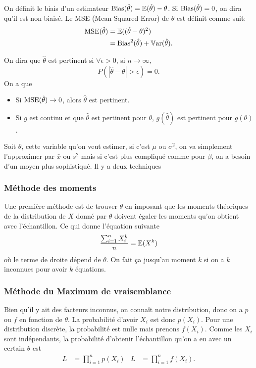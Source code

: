 On définit le biais d'un estimateur $\operatorname{Bias}(\hat{\theta}) = \mathbb{E}(\hat{\theta}) - \theta$.
Si $\operatorname{Bias}(\hat{\theta}) = 0$, on dira qu'il est non biaisé.
Le MSE (Mean Squared Error) de $\hat{\theta}$ est définit comme suit:
\begin{align*}
  \operatorname{MSE}(\hat{\theta}) & = \mathbb{E}((\hat{\theta} - \theta)^2)\\
                    & = \operatorname{Bias}^2(\hat{\theta}) + \operatorname{\mathbb{V}ar}(\hat{\theta}).
\end{align*}

On dira que $\hat{\theta}$ est pertinent si $\forall \epsilon > 0$,
si $n \to \infty$,
\[ P(|\hat{\theta} - \theta| > \epsilon) = 0. \]
On a que
\begin{itemize}
  \item Si $\operatorname{MSE}(\hat{\theta}) \to 0$, alors $\hat\theta$ est pertinent.
  \item Si $g$ est continu et que $\hat\theta$ est pertinent pour $\theta$,
    $g(\hat{\theta})$ est pertinent pour $g(\theta)$.
\end{itemize}

Soit $\theta$, cette variable qu'on veut estimer,
si c'est $\mu$ ou $\sigma^2$, on va simplement l'approximer par $\bar{x}$ ou $s^2$ mais
si c'est plus compliqué comme pour $\beta$, on a besoin d'un moyen plus sophistiqué.
Il y a deux techniques

\subsubsection{Méthode des moments}
Une première méthode est de trouver $\theta$ en imposant que les moments théoriques
de la distribution de $X$ donné par $\theta$ doivent égaler les moments qu'on obtient
avec l'échantillon.
Ce qui donne l'équation suivante
\[ \frac{\sum_{i = 1}^n X_i^k}{n} = \mathbb{E}(X^k) \]
où le terme de droite dépend de $\theta$.
On fait ça jusqu'au moment $k$ si on a $k$ inconnues pour avoir $k$ équations.

\subsubsection{Méthode du Maximum de vraisemblance}
Bien qu'il y ait des facteurs inconnus,
on connaît notre distribution,
donc on a $p$ ou $f$ en fonction de $\theta$.
La probabilité d'avoir $X_i$ est donc $p(X_i)$.
Pour une distribution discrète, la probabilité est nulle mais prenons $f(X_i)$.
Comme les $X_i$ sont indépendants,
la probabilité d'obtenir l'échantillon qu'on a eu avec un certain $\theta$ est
\begin{align*}
  L & = \prod_{i=1}^n p(X_i) & L & = \prod_{i=1}^n f(X_i).
\end{align*}

